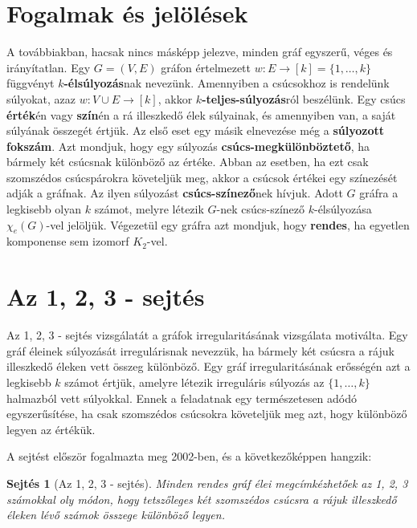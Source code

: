\documentclass[12pt, a4paper]{report}
\newtheorem{sej}[tét]{Sejtés}
\theoremstyle{remark}
\theoremstyle{definition}
\begin{document}
\section{Fogalmak és jelölések}
A továbbiakban, hacsak nincs másképp jelezve, minden gráf egyszerű, véges és irányítatlan. Egy $G = (V, E)$ gráfon értelmezett $w: E \rightarrow [k] = \lbrace 1, \ldots, k \rbrace$ függvényt \textbf{$k$-élsúlyozás}nak nevezünk. Amennyiben a csúcsokhoz is rendelünk súlyokat, azaz $w: V \cup E \rightarrow [k]$, akkor \textbf{$k$-teljes-súlyozás}ról beszélünk. Egy csúcs \textbf{érték}én vagy \textbf{szín}én a rá illeszkedő élek súlyainak, és amennyiben van, a saját súlyának összegét értjük. Az első eset egy másik elnevezése még a \textbf{súlyozott fokszám}. Azt mondjuk, hogy egy súlyozás \textbf{csúcs-megkülönböztető}, ha bármely két csúcsnak különböző az értéke. Abban az esetben, ha ezt csak szomszédos csúcspárokra követeljük meg, akkor a csúcsok értékei egy színezését adják a gráfnak. Az ilyen súlyozást \textbf{csúcs-színező}nek hívjuk. Adott $G$ gráfra a legkisebb olyan $k$ számot, melyre létezik $G$-nek csúcs-színező $k$-élsúlyozása $\chi_e(G)$-vel jelöljük. Végezetül egy gráfra azt mondjuk, hogy \textbf{rendes}, ha egyetlen komponense sem izomorf $K_2$-vel.

\section{Az 1, 2, 3 - sejtés}
Az 1, 2, 3 - sejtés vizsgálatát a gráfok irregularitásának vizsgálata motiválta. Egy gráf éleinek súlyozását irregulárisnak nevezzük, ha bármely két csúcsra a rájuk illeszkedő éleken vett összeg különböző. Egy gráf irregularitásának erősségén azt a legkisebb $k$ számot értjük, amelyre létezik irreguláris súlyozás az $\lbrace 1, \ldots, k \rbrace$ halmazból vett súlyokkal. Ennek a feladatnak egy természetesen adódó egyszerűsítése, ha csak szomszédos csúcsokra követeljük meg azt, hogy különböző legyen az értékük. 

A sejtést először \citeauthor{Karonski2004} \cite{Karonski2004} fogalmazta meg 2002-ben, és a következőképpen hangzik: 

\begin{sej}[Az 1, 2, 3 - sejtés]
Minden rendes gráf élei megcímkézhetőek az 1, 2, 3 számokkal oly módon, hogy tetszőleges két szomszédos csúcsra a rájuk illeszkedő éleken lévő számok összege különböző legyen.
\end{sej}
\end{document}
